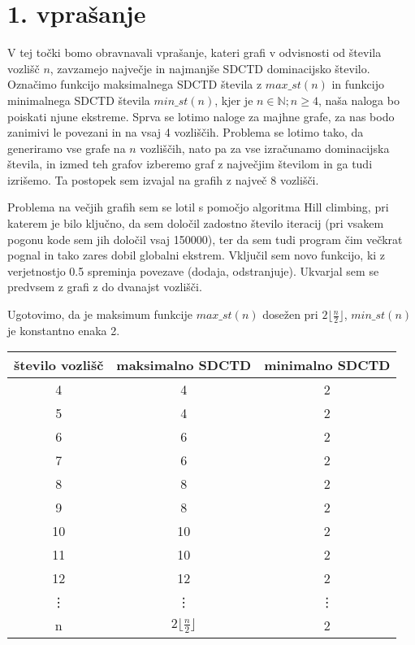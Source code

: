 \documentclass[12pt]{article}
\begin{document}
\section{1. vprašanje}
V tej točki bomo obravnavali vprašanje, kateri grafi v odvisnosti od števila vozlišč $n$, zavzamejo največje in najmanjše SDCTD dominacijsko število. Označimo funkcijo maksimalnega SDCTD števila z $max\_st(n)$ in funkcijo minimalnega SDCTD števila $min\_st(n)$, kjer je $n \in \mathbb{N}; n \geq 4$, naša naloga bo poiskati njune ekstreme. 
Sprva se lotimo naloge za majhne grafe, za nas bodo zanimivi le povezani in na vsaj 4 vozliščih. Problema se lotimo tako, da generiramo vse grafe na $n$ vozliščih, nato pa za vse izračunamo dominacijska števila, in izmed teh grafov izberemo graf z največjim številom in ga tudi izrišemo. 
Ta postopek sem izvajal na grafih z največ 8 vozlišči.

\vspace{12pt}
\noindent Problema na večjih grafih sem se lotil s pomočjo algoritma Hill climbing, pri katerem je bilo ključno, da sem določil zadostno število iteracij (pri vsakem pogonu kode sem jih določil vsaj 150000), ter da sem tudi program čim večkrat pognal in tako zares dobil globalni ekstrem. 
Vključil sem novo funkcijo, ki z verjetnostjo 0.5 spreminja povezave (dodaja, odstranjuje). Ukvarjal sem se predvsem z grafi z do dvanajst vozlišči.

\vspace{12pt}
\noindent Ugotovimo, da je maksimum funkcije $max\_st(n)$ dosežen pri $2 \lfloor \frac{n}{2} \rfloor$, $min\_st(n)$ je konstantno enaka 2. 

\begin{center}
    \begin{tabular}{|c|c|c|} 
     \hline
     število vozlišč & maksimalno SDCTD & minimalno SDCTD \\ [0.5ex] 
     \hline 
     4 & 4 & 2 \\
     \hline
     5 & 4 & 2 \\
     \hline 
     6 & 6 & 2 \\ 
     \hline
     7 & 6 & 2 \\
     \hline
     8 & 8 & 2 \\
     \hline
     9 & 8 & 2 \\
     \hline
     10 & 10 & 2 \\  
     \hline
     11 & 10 & 2 \\
     \hline
     12 & 12 & 2 \\  
     \hline
     \vdots & \vdots & \vdots \\  
     \hline
     n & $ 2 \lfloor \frac{n}{2} \rfloor$ & 2 \\ [1ex] 
     \hline
    \end{tabular}
\end{center}
\end{document}

